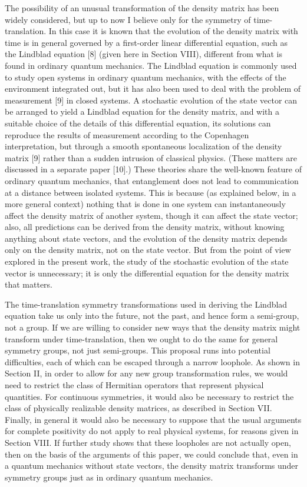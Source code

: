 \documentclass[12pt]{article}
\begin{document}
The possibility of an unusual transformation of the density matrix has been widely considered, but up to now I believe only for the symmetry of time-translation.  In this case it is known that the evolution of the density matrix with time is in general governed by a first-order linear differential equation, such as the Lindblad equation [8] (given here in Section VIII), different from what is found in ordinary quantum mechanics.  The Lindblad equation is commonly used to study open systems in ordinary quantum mechanics, with the effects of the environment integrated out, but it has also been  used to deal with the problem of measurement [9] in closed systems.  A stochastic evolution of the state vector can be arranged to yield a Lindblad equation for the density matrix, and with a  suitable choice of the details of this differential equation, its solutions can reproduce the results of measurement according to the Copenhagen interpretation, but through a smooth spontaneous localization of the density matrix [9] rather than a sudden intrusion of classical physics.  (These matters are discussed in a separate paper [10].)  These theories share the well-known feature of ordinary quantum mechanics, that entanglement does not lead to communication at a distance between isolated systems.  This is because (as explained below, in a more general context) nothing that is done in one system can instantaneously affect the density matrix of another system, though it can affect the state vector; also, all predictions can be derived from the density matrix, without knowing anything about state vectors, and the evolution of the density matrix depends only on the density matrix, not on the state vector.  But from the point of view explored in the present work, the study of the stochastic evolution of the state vector is unnecessary; it is only the differential equation for the density matrix that matters.  



The time-translation symmetry transformations used in deriving the Lindblad equation take us only into the future, not the past, and hence form a semi-group, not a group.  If we are willing to consider new ways that the density matrix might transform under time-translation, then we ought to do the same for general symmetry groups, not just semi-groups.   This proposal runs into potential difficulties, each of which can be escaped through a narrow loophole.  As shown in Section II, in order to allow for any new group transformation rules, we would need to restrict the class of Hermitian operators that represent physical quantities.  For continuous symmetries, it would also be necessary to restrict the class of physically realizable density matrices, as described in Section VII.  Finally, in general it would also be necessary to suppose that the usual arguments for complete positivity do not apply to real physical systems, for reasons given in Section VIII.  If further study shows that these loopholes are not actually open, then on the basis of the arguments of this paper, we could conclude that, even in a quantum mechanics without state vectors, the density matrix transforms under symmetry groups just as in ordinary quantum mechanics.
\end{document}
